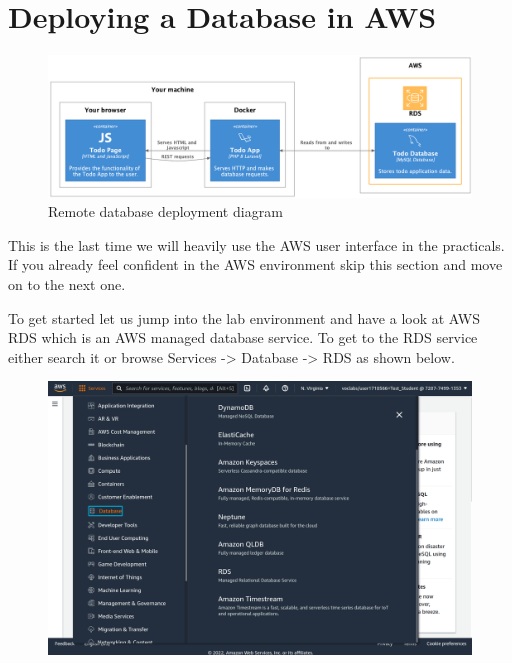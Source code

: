 \documentclass{csse4400}
\begin{document}
\section{Deploying a Database in AWS}



\begin{figure}[ht]
\includegraphics[width=\textwidth]{diagrams/remotedb}
\caption{Remote database deployment diagram}
\end{figure}

This is the last time we will heavily use the AWS user interface in the practicals. If you already feel confident in the AWS environment skip this section and move on to the next one.


To get started let us jump into the lab environment and have a look at AWS RDS which is an AWS managed database service. To get to the RDS service either search it or browse Services -> Database -> RDS as shown below.

\begin{figure}[H]
\includegraphics[width=\textwidth]{images/aws_1}
\end{figure}
\end{document}
